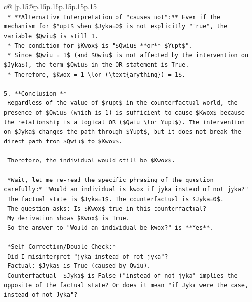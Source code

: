 \documentclass{article}
\begin{document}
{\begin{supertabular}{c@{$\;$}|p{.15\linewidth}@{}p{.15\linewidth}p{.15\linewidth}p{.15\linewidth}p{.15\linewidth}p{.15\linewidth}}
{{{\\ 
\texttt{    *   **Alternative Interpretation of "causes not":** Even if the mechanism for \$Yupt\$ when \$Jyka=0\$ is not explicitly "True", the variable \$Qwiu\$ is still 1.} \\
\texttt{    *   The condition for \$Kwox\$ is "\$Qwiu\$ **or** \$Yupt\$".} \\
\texttt{    *   Since \$Qwiu = 1\$ (and \$Qwiu\$ is not affected by the intervention on \$Jyka\$), the term \$Qwiu\$ in the OR statement is True.} \\
\texttt{    *   Therefore, \$Kwox = 1 \textbackslash{}lor (\textbackslash{}text\{anything\}) = 1\$.} \\
\\ 
\texttt{5.  **Conclusion:**} \\
\texttt{    Regardless of the value of \$Yupt\$ in the counterfactual world, the presence of \$Qwiu\$ (which is 1) is sufficient to cause \$Kwox\$ because the relationship is a logical OR (\$Qwiu \textbackslash{}lor Yupt\$). The intervention on \$Jyka\$ changes the path through \$Yupt\$, but it does not break the direct path from \$Qwiu\$ to \$Kwox\$.} \\
\\ 
\texttt{    Therefore, the individual would still be \$Kwox\$.} \\
\\ 
\texttt{    *Wait, let me re{-}read the specific phrasing of the question carefully:* "Would an individual is kwox if jyka instead of not jyka?"} \\
\texttt{    The factual state is \$Jyka=1\$. The counterfactual is \$Jyka=0\$.} \\
\texttt{    The question asks: Is \$Kwox\$ true in this counterfactual?} \\
\texttt{    My derivation shows \$Kwox\$ is True.} \\
\texttt{    So the answer to "Would an individual be kwox?" is **Yes**.} \\
\\ 
\texttt{    *Self{-}Correction/Double Check:*} \\
\texttt{    Did I misinterpret "jyka instead of not jyka"?} \\
\texttt{    Factual: \$Jyka\$ is True (caused by Qwiu).} \\
\texttt{    Counterfactual: \$Jyka\$ is False ("instead of not jyka" implies the opposite of the factual state? Or does it mean "if Jyka were the case, instead of not Jyka"?} \\
}}}
\end{supertabular}}
\end{document}
